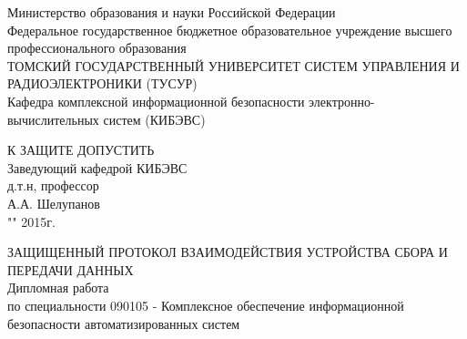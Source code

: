 \newpage
{}

\begin{center}
Министерство образования и науки Российской Федерации\\
Федеральное государственное бюджетное образовательное учреждение высшего профессионального образования\\
ТОМСКИЙ ГОСУДАРСТВЕННЫЙ УНИВЕРСИТЕТ СИСТЕМ УПРАВЛЕНИЯ И РАДИОЭЛЕКТРОНИКИ (ТУСУР)\\
Кафедра комплексной информационной безопасности электронно-вычислительных систем (КИБЭВС)\\
\end{center}

\hfill
\begin{minipage}[right]{0.42\linewidth}
\begin{singlespace}
 К ЗАЩИТЕ ДОПУСТИТЬ \\
 Заведующий кафедрой КИБЭВС \\
 д.т.н, профессор \\
 \underline{\hspace{2.5cm}}А.А. Шелупанов \\
 "\underline{\hspace{1cm}}"\underline{\hspace{3cm}} 2015г.\\
\end{singlespace} 
\end{minipage}


\begin{center}
ЗАЩИЩЕННЫЙ ПРОТОКОЛ ВЗАИМОДЕЙСТВИЯ УСТРОЙСТВА СБОРА И ПЕРЕДАЧИ ДАННЫХ \\
Дипломная работа \\
по специальности 090105 - Комплексное обеспечение информационной безопасности автоматизированных систем \\
\vspace{2cm}
\end{center}


